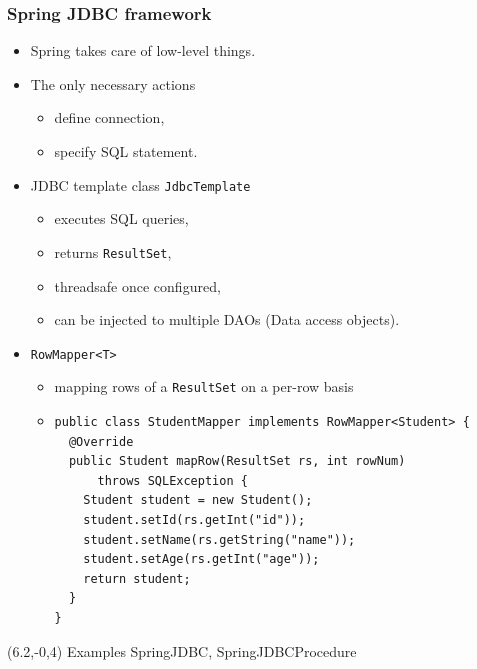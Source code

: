 \documentclass[10pt,xcolor=pdflatex, table]{beamer}
\begin{document}
\begin{frame}[fragile]\frametitle{Spring JDBC framework}
	\begin{itemize}
		\item Spring takes care of low-level things.
		\item The only necessary actions
          \begin{itemize}
        	\item define connection,
        	\item specify SQL statement.
          \end{itemize}
		\item JDBC template class \texttt{JdbcTemplate}
          \begin{itemize}
        	\item executes SQL queries,
        	\item returns \texttt{ResultSet},
        	\item threadsafe once configured,
        	\item can be injected to multiple DAOs (Data access objects).
          \end{itemize}
        \item \texttt{RowMapper<T>}
          \begin{itemize}
            \item mapping rows of a \texttt{ResultSet} on a per-row basis
            \item[] \begin{footnotesize}
            \begin{verbatim}
public class StudentMapper implements RowMapper<Student> {
  @Override
  public Student mapRow(ResultSet rs, int rowNum) 
      throws SQLException {
    Student student = new Student();
    student.setId(rs.getInt("id"));
    student.setName(rs.getString("name"));
    student.setAge(rs.getInt("age"));
    return student;
  }
}
            \end{verbatim}\end{footnotesize}
          \end{itemize}
	\end{itemize}
\begin{textblock}{15}(6.2,-0,4)
    {\footnotesize Examples SpringJDBC, SpringJDBCProcedure}
\end{textblock}
\end{frame}
\end{document}
